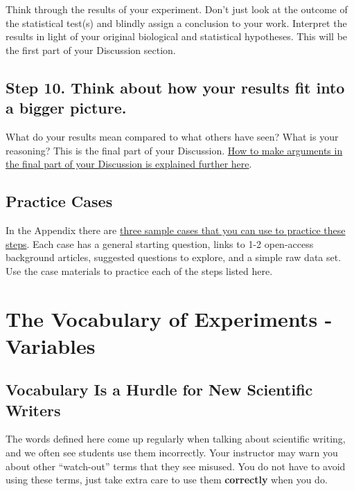\documentclass[
]{book}
\begin{document}
Think through the results of your experiment. Don't just look at the outcome of the statistical test(s) and blindly assign a conclusion to your work. Interpret the results in light of your original biological and statistical hypotheses. This will be the first part of your Discussion section.

\hypertarget{step-10.-think-about-how-your-results-fit-into-a-bigger-picture.}{%
\section*{Step 10. Think about how your results fit into a bigger picture.}\label{step-10.-think-about-how-your-results-fit-into-a-bigger-picture.}}

What do your results mean compared to what others have seen? What is your reasoning? This is the final part of your Discussion. \protect\hyperlink{discussion380}{How to make arguments in the final part of your Discussion is explained further here}.

\hypertarget{practice-cases}{%
\section{Practice Cases}\label{practice-cases}}

In the Appendix there are \protect\hyperlink{overview}{three sample cases that you can use to practice these steps}. Each case has a general starting question, links to 1-2 open-access background articles, suggested questions to explore, and a simple raw data set. Use the case materials to practice each of the steps listed here.

\hypertarget{variables215}{%
\chapter{The Vocabulary of Experiments - Variables}\label{variables215}}

\hypertarget{vocabulary-is-a-hurdle-for-new-scientific-writers}{%
\section{Vocabulary Is a Hurdle for New Scientific Writers}\label{vocabulary-is-a-hurdle-for-new-scientific-writers}}

The words defined here come up regularly when talking about scientific writing, and we often see students use them incorrectly. Your instructor may warn you about other ``watch-out'' terms that they see misused. You do not have to avoid using these terms, just take extra care to use them \textbf{correctly} when you do.
\end{document}

